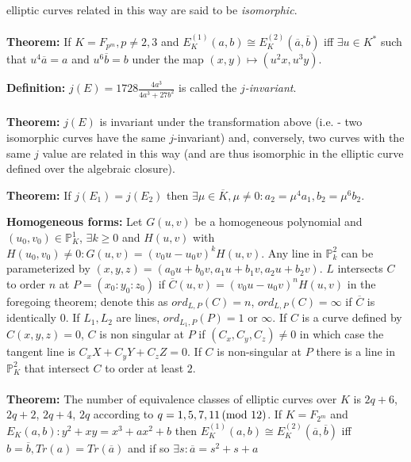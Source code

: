 elliptic curves related in this way are said to be \emph{isomorphic}.
\\
\\
{\bf Theorem:}
If $K= F_{p^m}, p \ne 2, 3$ and 
$E_K^{(1)}(a, b) \cong E_K^{(2)}({\overline a}, {\overline b})$ iff 
$\exists u \in K^*$ such that $u^4 {\overline a}=a$ and
$u^6 {\overline b}=b$ under the map $(x,y) \mapsto (u^2 x, u^3 y)$.
\begin{quote}
\end{quote}
{\bf Definition:}
$j(E)= 1728 {\frac {4a^3} {4a^3+27b^2}}$ is called the
\emph{$j$-invariant}. 
\\
\\
{\bf Theorem:}
$j(E)$ is invariant under 
the transformation above (i.e. - two isomorphic curves have the same
$j$-invariant) and, conversely, two curves with the same $j$ value are related in 
this way (and are
thus isomorphic in the elliptic curve defined over the algebraic closure).
\begin{quote}
\end{quote}
{\bf Theorem:}
If $j(E_1)=j(E_2)$ then
$\exists \mu \in {\overline K}, \mu \ne 0: a_2= \mu^4 a_1, b_2= \mu^6 b_2$.  
\begin{quote}
\end{quote}
{\bf Homogeneous forms:}
Let $G(u,v)$ be a homogeneous polynomial and $(u_0, v_0) \in {\mathbb P}^1_K$,
$\exists k \ge 0$ and $H(u, v)$ with $H(u_0, v_0) \ne 0: G(u,v)= (v_0 u -u_0 v)^k H(u,v)$.
Any line in ${\mathbb P}^2_k$ can be parameterized by 
$(x,y,z)= (a_0 u + b_0 v, a_1 u + b_1 v, a_2 u + b_2 v)$.
$L$ intersects $C$ to order $n$ at $P=(x_0 : y_0 : z_0)$ if ${\overline C}(u,v) =
(v_0 u - u_0 v)^n H(u,v)$ in the foregoing theorem; denote this as $ord_{L, P}(C)=n$,
$ord_{L, P}(C)= \infty$ if ${\overline C}$ is identically 0.  
If $L_1, L_2$ are lines, $ord_{L_1, P}(P)= 1$
or $\infty$.  If $C$ is a curve defined by $C(x,y,z)=0$, $C$ is non singular at $P$ if
$(C_x, C_y, C_z) \ne 0$ in which case the tangent line is $C_x X + C_y Y + C_z Z =0$.  If
$C$ is non-singular at $P$ there is a line in ${\mathbb P}^2_K$ that intersect $C$ to order at
least $2$.
\\
\\
{\bf Theorem:}
The number of equivalence classes of elliptic curves over $K$ is
$2q+6$, $2q+2$, $2q+4$, $2q$ according to $q = 1, 5, 7, 11 \thinspace \textnormal{(mod } 12 \textnormal{)}$.
If $K= F_{2^m}$ and $E_K(a, b): y^2 + xy = x^3 + a x^2 +b$ then
$E_K^{(1)}(a, b) \cong E_K^{(2)}({\overline a}, {\overline b})$ iff 
$b= {\overline b}, Tr(a)=Tr({\overline a})$ and if so $\exists s: {\overline a}= s^2+s+a$ 
